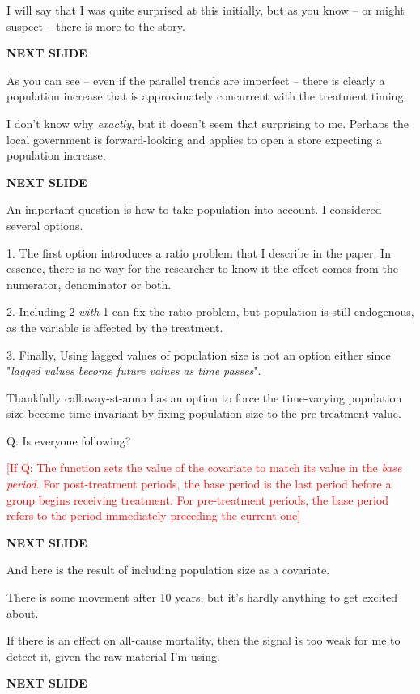 \documentclass[12pt]{article}
\newcommand{\TODO}[1]{\textcolor{red}{[#1]}}
\begin{document}
I will say that I was quite surprised at this initially, but as you know -- or might suspect -- there is more to the story. 

\textbf{NEXT SLIDE}

As you can see -- even if the parallel trends are imperfect -- there is clearly a population increase that is approximately concurrent with the treatment timing. 

I don't know why \emph{exactly}, but it doesn't seem that surprising to me. Perhaps the local government is forward-looking and applies to open a store expecting a population increase.

\textbf{NEXT SLIDE}

An important question is how to take population into account. I considered several options. 

1. The first option introduces a ratio problem that I describe in the paper. In essence, there is no way for the researcher to know it the effect comes from the numerator, denominator or both. 

2. Including 2 \emph{with} 1 can fix the ratio problem, but population is still endogenous, as the variable is affected by the treatment. 

3. Finally, Using lagged values of population size is not an option either since "\emph{lagged values become future values as time passes}".

Thankfully callaway-st-anna has an option to force the time-varying population size become time-invariant by fixing population size to the pre-treatment value. 

Q: Is everyone following?



\TODO{If Q: The function sets the value of the covariate to match its value in the \emph{base period}. For post-treatment periods, the base period is the last period before a group begins receiving treatment. For pre-treatment periods, the base period refers to the period immediately preceding the current one}

\textbf{NEXT SLIDE}

And here is the result of including population size as a covariate.

There is some movement after 10 years, but it's hardly anything to get excited about. 

If there is an effect on all-cause mortality, then the signal is too weak for me to detect it, given the raw material I'm using.

\textbf{NEXT SLIDE}
\end{document}
